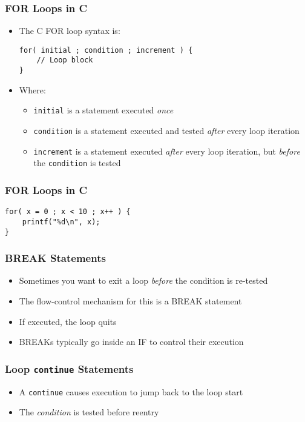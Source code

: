 \documentclass[14pt]{beamer}
\begin{document}
\begin{frame}[fragile]
\frametitle{FOR Loops in C}
\begin{itemize}
\item The C FOR loop syntax is:
\begin{lstlisting}[style=CStyle]
for( initial ; condition ; increment ) {
	// Loop block
}
\end{lstlisting}
\item Where:
	\begin{itemize}
		\item \texttt{initial} is a statement executed \textit{once}
		\item \texttt{condition} is a statement executed and tested \textit{after} every loop iteration
		\item \texttt{increment} is a statement executed \textit{after} every loop iteration, but \textit{before} the \texttt{condition} is tested
	\end{itemize}
\end{itemize}
\end{frame}

\begin{frame}[fragile]
\frametitle{FOR Loops in C}
\begin{lstlisting}[style=CStyle]
for( x = 0 ; x < 10 ; x++ ) {
	printf("%d\n", x);
}
\end{lstlisting}
\end{frame}

\begin{frame}
\frametitle{BREAK Statements}
\begin{itemize}
\item Sometimes you want to exit a loop \textit{before} the condition is re-tested
\item The flow-control mechanism for this is a BREAK statement
\item If executed, the loop quits
\item BREAKs typically go inside an IF to control their execution
\end{itemize}
\end{frame}

\begin{frame}
\frametitle{Loop \texttt{continue} Statements}
\begin{itemize}
	\item A \texttt{continue} causes execution to jump back to the loop start
	\item The \textit{condition} is tested before reentry	
\end{itemize}
\end{frame}
\end{document}
